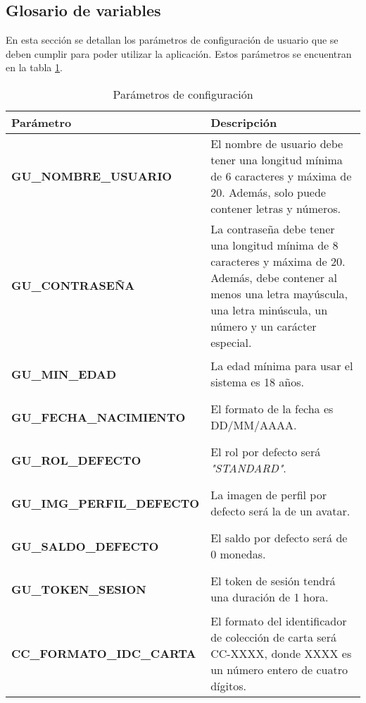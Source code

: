 \subsection{Glosario de variables}\hypertarget{anexo:glosario_variables}{}
En esta sección se detallan los parámetros de configuración de usuario que se deben cumplir para poder utilizar la aplicación. Estos parámetros se encuentran en la tabla \ref{table:variables_requisitos}.
\begin{table}[htb]
    \centering
    \caption{Parámetros de configuración}
    \label{table:variables_requisitos}
    \begin{tabular}{>{\columncolor{lightgreen!20}}p{7cm} p{10cm}}
    \toprule
    \rowcolor{darkgreen!50}
    \textbf{Parámetro} & \textbf{Descripción} \\
    \midrule
    \hypertarget{confParam:gu-nombreUsuario}{}
    \textbf{GU\_NOMBRE\_USUARIO} & El nombre de usuario debe tener una longitud mínima de 6 caracteres y máxima de 20. Además, solo puede contener letras y números.  \\
    \midrule
    \hypertarget{confParam:gu-contrasena}{}
    \textbf{GU\_CONTRASEÑA} & La contraseña debe tener una longitud mínima de 8 caracteres y máxima de 20. Además, debe contener al menos una letra mayúscula, una letra minúscula, un número y un carácter especial. \\
    \midrule
    \hypertarget{confParam:gu-minEdad}{}
    \textbf{GU\_MIN\_EDAD} & La edad mínima para usar el sistema es 18 años. \\
    \midrule
    \hypertarget{confParam:gu-fechaNacimiento}{}
    \textbf{GU\_FECHA\_NACIMIENTO} & El formato  de la fecha es DD/MM/AAAA. \\
    \midrule
    \hypertarget{confParam:gu-rolDefecto}{}
    \textbf{GU\_ROL\_DEFECTO} & El rol por defecto será \textit{"STANDARD"}. \\
    \midrule
    \hypertarget{confParam:gu-imgPerfilDefecto}{}
    \textbf{GU\_IMG\_PERFIL\_DEFECTO} & La imagen de perfil por defecto será la de un avatar.  \\
    \midrule
    \hypertarget{confParam:gu-saldoDefecto}{}
    \textbf{GU\_SALDO\_DEFECTO} & El saldo por defecto será de 0 monedas. \\
    \midrule
    \hypertarget{confParam:gu-tokenSesion}{}
    \textbf{GU\_TOKEN\_SESION} & El token de sesión tendrá una duración de 1 hora. \\
    \midrule
    \hypertarget{confParam:cc-formatoIDCCarta}{}
    \textbf{CC\_FORMATO\_IDC\_CARTA} & El formato del identificador de colección de carta será CC-XXXX, donde XXXX es un número entero de cuatro dígitos. \\
    \bottomrule
    \end{tabular}
\end{table}